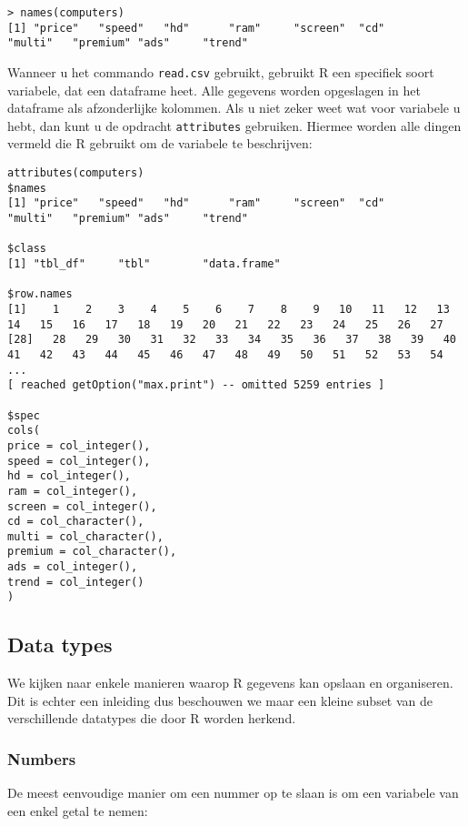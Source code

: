 \begin{lstlisting}[breaklines=true]
> names(computers)
[1] "price"   "speed"   "hd"      "ram"     "screen"  "cd"      "multi"   "premium" "ads"     "trend"
\end{lstlisting}

Wanneer u het commando \texttt{read.csv} gebruikt, gebruikt R een specifiek soort variabele, dat een dataframe heet. Alle gegevens worden opgeslagen in het dataframe als afzonderlijke kolommen. Als u niet zeker weet wat voor variabele u hebt, dan kunt u de opdracht \texttt{attributes} gebruiken. Hiermee worden alle dingen vermeld die R gebruikt om de variabele te beschrijven:

\begin{lstlisting}[breaklines=true]
attributes(computers)
$names
[1] "price"   "speed"   "hd"      "ram"     "screen"  "cd"      "multi"   "premium" "ads"     "trend"  

$class
[1] "tbl_df"     "tbl"        "data.frame"

$row.names
[1]    1    2    3    4    5    6    7    8    9   10   11   12   13   14   15   16   17   18   19   20   21   22   23   24   25   26   27
[28]   28   29   30   31   32   33   34   35   36   37   38   39   40   41   42   43   44   45   46   47   48   49   50   51   52   53   54
...
[ reached getOption("max.print") -- omitted 5259 entries ]

$spec
cols(
price = col_integer(),
speed = col_integer(),
hd = col_integer(),
ram = col_integer(),
screen = col_integer(),
cd = col_character(),
multi = col_character(),
premium = col_character(),
ads = col_integer(),
trend = col_integer()
)

\end{lstlisting}

\subsection{Data types}

We kijken naar enkele manieren waarop R gegevens kan opslaan en organiseren. Dit is echter een inleiding dus beschouwen we maar een kleine subset van de verschillende datatypes die door R worden herkend. 

\subsubsection{Numbers}

De meest eenvoudige manier om een nummer op te slaan is om een variabele van een enkel getal te nemen:

